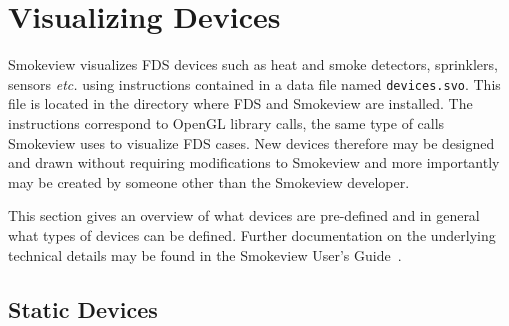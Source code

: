 %
%
\newcommand{\devicewidth}{1.5in}
\newcommand{\boxwidth}{2.5in}
\newcommand{\incgraphics}[1]{
\parbox[c]{\devicewidth}{
\vspace{0.01in}
\texttt{[image: \#1]}
\vspace{0.01in}
}
}


\section{Visualizing Devices}

Smokeview visualizes FDS devices such as heat and smoke detectors,
sprinklers, sensors {\em etc.} using instructions contained in a
data file named {\tt devices.svo}.
This file is located in the directory where FDS and Smokeview are installed.
The instructions correspond to OpenGL library calls,
the same type of calls Smokeview uses to visualize FDS cases.
New
devices therefore may be designed and drawn without requiring modifications to Smokeview and more importantly may be created by someone other than the Smokeview developer.



This section gives an overview of what devices are pre-defined and in general what types of devices can be defined.  Further documentation on the underlying technical details may be found in the Smokeview User's Guide~\cite{Smokeview_Users_Guide_5}.

\subsection{Static Devices}

